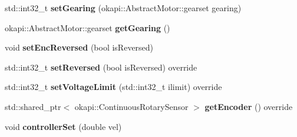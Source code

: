\begin{DoxyCompactItemize}
std\+::int32\+\_\+t {\bfseries set\+Gearing} (okapi\+::\+Abstract\+Motor\+::gearset gearing)
\item 
\mbox{\label{classExtraSpecialMotorWithExternalSensorsAsEncoders_a60073af076a7e168da6ad4912b7eb7b5}} 
okapi\+::\+Abstract\+Motor\+::gearset {\bfseries get\+Gearing} ()
\item 
\mbox{\label{classExtraSpecialMotorWithExternalSensorsAsEncoders_aac68d3e2998d7200b405770d87b2538b}} 
void {\bfseries set\+Enc\+Reversed} (bool is\+Reversed)
\item 
\mbox{\label{classExtraSpecialMotorWithExternalSensorsAsEncoders_a43070ed9fe14fa70a8b7ba886385d7f1}} 
std\+::int32\+\_\+t {\bfseries set\+Reversed} (bool is\+Reversed) override
\item 
\mbox{\label{classExtraSpecialMotorWithExternalSensorsAsEncoders_a9ba712a6d09f2c4e5c88a300ff7da8ae}} 
std\+::int32\+\_\+t {\bfseries set\+Voltage\+Limit} (std\+::int32\+\_\+t ilimit) override
\item 
\mbox{\label{classExtraSpecialMotorWithExternalSensorsAsEncoders_ad27c1889e5a973795c41625b849f7259}} 
std\+::shared\+\_\+ptr$<$ okapi\+::\+Continuous\+Rotary\+Sensor $>$ {\bfseries get\+Encoder} () override
\item 
\mbox{\label{classExtraSpecialMotorWithExternalSensorsAsEncoders_a9fd9f2baa1066023a25a62a2415857e5}} 
void {\bfseries controller\+Set} (double vel)
\end{DoxyCompactItemize}
